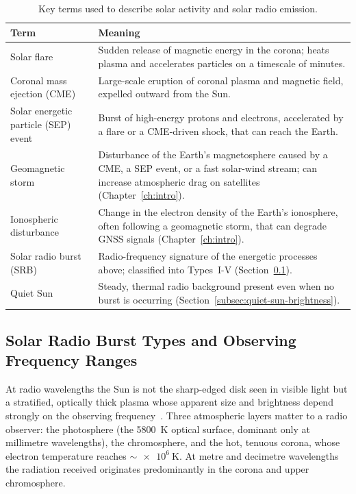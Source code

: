 \begin{table}[H]
  \centering
  \caption[Key terms used to describe solar activity and solar radio emission]{Key terms used to describe solar activity and solar radio emission.}
  \label{tab:solar-terms}
  \renewcommand{\arraystretch}{1.3}
  \begin{tabularx}{\textwidth}{l >{\raggedright\arraybackslash}X}
    \toprule
    \textbf{Term} & \textbf{Meaning} \\
    \midrule
    Solar flare & Sudden release of magnetic energy in the corona; heats plasma and accelerates particles on a timescale of minutes. \\
    Coronal mass ejection (CME) & Large-scale eruption of coronal plasma and magnetic field, expelled outward from the Sun. \\
    Solar energetic particle (SEP) event & Burst of high-energy protons and electrons, accelerated by a flare or a CME-driven shock, that can reach the Earth. \\
    Geomagnetic storm & Disturbance of the Earth's magnetosphere caused by a CME, a SEP event, or a fast solar-wind stream; can increase atmospheric drag on satellites (Chapter~\ref{ch:intro}). \\
    Ionospheric disturbance & Change in the electron density of the Earth's ionosphere, often following a geomagnetic storm, that can degrade GNSS signals (Chapter~\ref{ch:intro}). \\
    Solar radio burst (SRB) & Radio-frequency signature of the energetic processes above; classified into Types~I-V (Section~\ref{subsec:burst-types}). \\
    Quiet Sun & Steady, thermal radio background present even when no burst is occurring (Section~\ref{subsec:quiet-sun-brightness}). \\
    \bottomrule
  \end{tabularx}
\end{table}

\subsection{Solar Radio Burst Types and Observing Frequency Ranges}
\label{subsec:burst-types}
At radio wavelengths the Sun is not the sharp-edged disk seen in visible light
but a stratified, optically thick plasma whose apparent size and brightness
depend strongly on the observing frequency~\citep{kundu1965,dulk1985}. Three
atmospheric layers matter to a radio observer: the photosphere (the
\SI{5800}{\kelvin} optical surface, dominant only at millimetre wavelengths),
the chromosphere, and the hot, tenuous corona, whose electron temperature
reaches $\sim\!\SI{e6}{\kelvin}$. At metre and decimetre wavelengths the
radiation received originates predominantly in the corona and upper
chromosphere.


